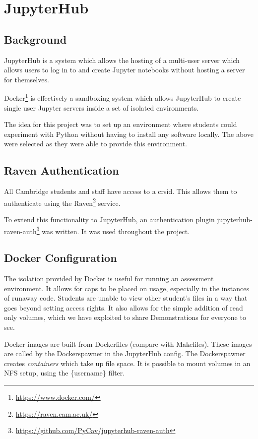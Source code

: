 \section{JupyterHub}
    \subsection{Background}
    
        JupyterHub is a system which allows the hosting of a multi-user server which allows users to log in to and create Jupyter notebooks without hosting a server for themselves.
    
        Docker\footnote{\url{https://www.docker.com/}} is effectively a sandboxing system which allows JupyterHub to create single user Jupyter servers inside a set of isolated environments.
        
        The idea for this project was to set up an environment where students could experiment with Python without having to install any software locally. The above were selected as they were able to provide this environment.
        
    \subsection{Raven Authentication}
    
        All Cambridge students and staff have access to a crsid. This allows them to authenticate using the Raven\footnote{\url{https://raven.cam.ac.uk/}} service.
        
        To extend this functionality to JupyterHub, an authentication plugin jupyterhub-raven-auth\footnote{\url{https://github.com/PyCav/jupyterhub-raven-auth}} was written. It was used throughout the project.
        
    \subsection{Docker Configuration}
        
        The isolation provided by Docker is useful for running an assessment environment. It allows for caps to be placed on usage, especially in the instances of runaway code. Students are unable to view other student's files in a way that goes beyond setting access rights. It also allows for the simple addition of read only volumes, which we have exploited to share Demonstrations for everyone to see.
        
        Docker images are built from Dockerfiles (compare with Makefiles). These images are called by the Dockerspawner in the JupyterHub config. The Dockerspawner creates \textit{containers} which take up file space. It is possible to mount volumes in an NFS setup, using the \{username\} filter.
        
